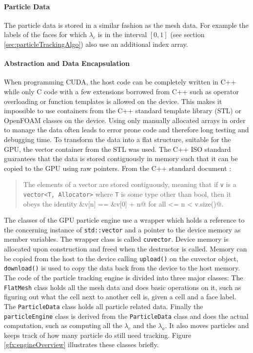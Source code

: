 \paragraph{Particle Data}

The particle data is stored in a similar fashion as the mesh data. For example the labels of the faces for which $\lambda_c$ is in the interval $[0,1]$ (see section \ref{sec:particleTrackingAlgo}) also use an additional index array.

\paragraph{Abstraction and Data Encapsulation}

When programming CUDA, the host code can be completely written in C++ while only C code with a few extensions borrowed from C++ such as operator overloading or function templates \cite[Appendix D]{cudaguide} is allowed on the device. This makes it impossible to use containers from the C++ standard template library (STL) or OpenFOAM classes on the device. Using only manually allocated arrays in order to manage the data often leads to error prone code and therefore long testing and debugging time. To transform the data into a flat structure, suitable for the GPU, the vector container from the STL was used. The C++ ISO standard guarantees that the data is stored contiguously in memory such that it can be copied to the GPU using raw pointers. From the C++ standard document \cite[23.3.6.1]{cpp}:

\begin{quote}
The elements of a vector are stored contiguously, meaning that if \verb+v+ is a \verb+vector<T, Allocator>+ where \verb+T+ is some type other than bool, then it obeys the identity \verb@&v[n] == &v[0] + n@ for all  <= n < v.size()@.
\end{quote}

The classes of the GPU particle engine use a wrapper which holds a reference to the concerning instance of \verb+std::vector+ and a pointer to the device memory as member variables. The wrapper class is called \verb+cuvector+. Device memory is allocated upon construction and freed when the destructor is called. Memory can be copied from the host to the device calling \verb+upload()+ on the cuvector object, \verb+download()+ is used to copy the data back from the device to the host memory. The code of the particle tracking engine is divided into three major classes: The \verb+FlatMesh+ class holds all the mesh data and does basic operations on it, such as figuring out what the cell next to another cell is, given a cell and a face label. The \verb+ParticleData+ class holds all particle related data. Finally the \verb+particleEngine+ class is derived from the \verb+ParticleData+ class and does the actual computation, such as computing all the $\lambda_c$ and the $\lambda_a$. It also moves particles and keeps track of how many particle do still need tracking. Figure \ref{gfx:engineOverview} illustrates these classes briefly.

